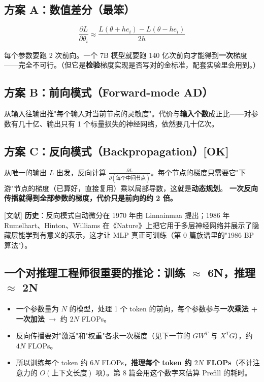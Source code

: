 \subsection{方案 A：数值差分（最笨）}

\[
\frac{\partial L}{\partial \theta_i} \approx \frac{L(\theta + h e_i) - L(\theta - h e_i)}{2h}
\]

每个参数要跑 2 次前向。一个 7B 模型就要跑 140 亿次前向才能得到\textbf{一次}梯度——完全不可行。（但它是\textbf{检验}梯度实现是否写对的金标准，配套实验里会用到。）

\subsection{方案 B：前向模式（Forward-mode AD）}

从输入往输出推"每个输入对当前节点的灵敏度"。代价与\textbf{输入个数}成正比——对参数有几十亿、输出只有 1 个标量损失的神经网络，依然要几十亿次。

\subsection{方案 C：反向模式（Backpropagation）[OK]}

从唯一的输出 $L$ 出发，反向计算 $\frac{\partial L}{\partial (\text{每个中间节点})}$。每个节点的梯度只需要它"下游"节点的梯度（已算好，直接复用）乘以局部导数，这就是\textbf{动态规划}。
\textbf{一次反向传播就得到全部参数的梯度，代价只是前向的约 2 倍。}

\begin{noteBox}[核心导读与背景]
{}[文献] \textbf{历史}：反向模式自动微分在 1970 年由 Linnainmaa 提出；1986 年 Rumelhart、Hinton、Williams 在《Nature》上把它用于多层神经网络并展示了隐藏层能学到有意义的表示，这才让 MLP 真正可训练（第 0 篇族谱里的"1986 BP 算法"）。
\end{noteBox}

\subsection{一个对推理工程师很重要的推论：训练 \texorpdfstring{$\approx$}{≈} 6N，推理 \texorpdfstring{$\approx$}{≈} 2N}

\begin{itemize}
  \item 一个参数量为 $N$ 的模型，处理 1 个 token 的前向，每个参数参与\textbf{一次乘法 + 一次加法} $\rightarrow$ 约 $2N$ FLOPs。
  \item 反向传播要对"激活"和"权重"各求一次梯度（见下一节的 $G W^T$ 与 $X^T G$），约 $4N$ FLOPs。
  \item 所以训练每个 token 约 $6N$ FLOPs，\textbf{推理每个 token 约 $2N$ FLOPs}（不计注意力的 $O(\text{上下文长度})$ 项）。第 8 篇会用这个数字来估算 Prefill 的耗时。
\end{itemize}


